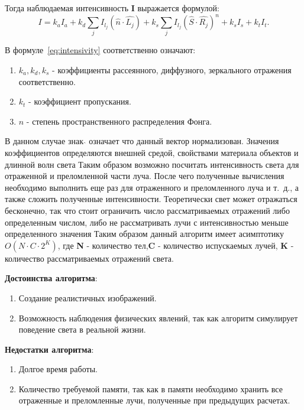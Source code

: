 Тогда наблюдаемая интенсивность \textbf{I} выражается формулой:
\begin{equation} 
	I = k_aI_a + k_d \sum_{j} I_{l_j}(\hat{n} \cdot \hat{L_j}) + k_s \sum_{j} I_{l_j}(\hat{S} \cdot \hat{R_j})^n + k_sI_s + k_tI_t.
	\label{eq:intensivity}
\end{equation}

В формуле~\ref{eq:intensivity} соответственно означают:
\begin{enumerate}
	\item $k_a,k_d,k_s$ - коэффициенты рассеянного, диффузного, зеркального отражения соответственно.
	\item $k_t$ - коэффициент пропускания.
	\item $n$ - степень пространственного распределения Фонга.
\end{enumerate}
В данном случае знак $ \hat{} $  означает что данный вектор нормализован.
Значения коэффициентов определяются внешней средой, свойствами материала объектов и длинной волн света
Таким образом возможно посчитать интенсивность света для отраженной и преломленной части луча.
После чего полученные вычисления необходимо выполнить еще раз для отраженного и преломленного луча и т.~д., а также сложить полученные интенсивности.
Теоретически свет может отражаться бесконечно, так что стоит ограничить число рассматриваемых отражений либо определенным числом,
либо не рассматривать лучи с интенсивностью меньше определенного значения
Таким образом данный алгоритм имеет асимптотику $O(N \cdot C \cdot 2^{K})$, где \textbf{N} - количество тел,\textbf{C} - количество испускаемых лучей,
\textbf{K} - количество рассматриваемых отражений света. \cite{Rodgers}



\textbf{Достоинства алгоритма}:
\begin{enumerate}
	\item Создание реалистичных изображений. \cite{Rodgers,modern_ray_tracing,SSR}
	\item Возможность наблюдения физических явлений, так как алгоритм симулирует поведение света в реальной жизни. \cite{Rodgers,modern_ray_tracing,SSR}
\end{enumerate}


\textbf{Недостатки алгоритма}:
\begin{enumerate}
	\item Долгое время работы. \cite{Rodgers,modern_ray_tracing,SSR}
	\item Количество требуемой памяти, так как в памяти необходимо хранить все отраженные и преломленные лучи, полученные при предыдущих расчетах. \cite{Rodgers,modern_ray_tracing,SSR}
\end{enumerate}


